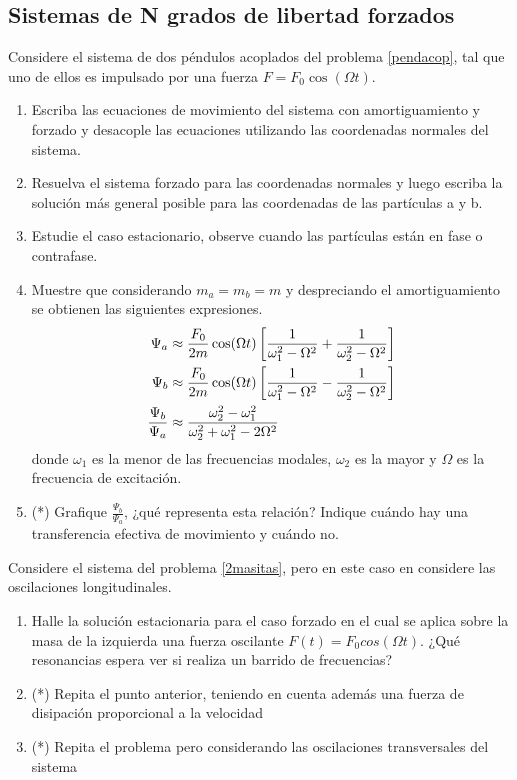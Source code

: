 \subsection*{Sistemas de N grados de libertad forzados}


\item Considere el sistema de dos péndulos acoplados del problema \ref{pendacop}, tal que uno de ellos es impulsado por una fuerza $F= F_0 \cos(\Omega t)$.  
\begin{enumerate}
	\item Escriba las ecuaciones de movimiento del sistema con amortiguamiento y forzado y desacople las ecuaciones utilizando las coordenadas normales del sistema.
	\item Resuelva el sistema forzado para las coordenadas normales y luego escriba la solución más general posible para las coordenadas de las partículas a y b.
	\item Estudie el caso estacionario, observe cuando las partículas están en fase o contrafase.
	\item Muestre que considerando $m_a= m_b= m$ y despreciando el amortiguamiento se obtienen las siguientes expresiones.
		\begin{align}
			\Psi_a &\approx \frac{F_0}{2m} \cos(\Omega t) \left[ \frac{1}{\omega_1^2 - \Omega^2 } + \frac{1}{\omega_2^2 -\Omega^2} \right] \notag \\
			\Psi_b &\approx \frac{F_0}{2m} \cos(\Omega t) \left[ \frac{1}{\omega_1^2 - \Omega^2 } - \frac{1}{\omega_2^2 -\Omega^2} \right] \notag \\
			\frac{\Psi_b}{\Psi_a} &\approx \frac{\omega_2^2 - \omega_1^2}{\omega_2^2 + \omega_1^2 - 2 \Omega^2} \notag
		\end{align}
	donde $\omega_{1}$ es la menor de las frecuencias modales, $\omega_{2}$ es la mayor y $\Omega$ es la frecuencia de excitación.
	\item (*) Grafique $\frac{\Psi_b}{\Psi_a}$, ¿qué representa esta relación?
	Indique cuándo hay una transferencia efectiva de movimiento y cuándo no.
\end{enumerate}


\item Considere el sistema del problema \ref{2masitas}, pero en este caso en considere las oscilaciones longitudinales.
\begin{enumerate}
    \item Halle la solución estacionaria para el caso forzado en el cual se aplica sobre la masa de la izquierda una fuerza oscilante $F(t)= F_0 cos(\Omega t)$.
		¿Qué resonancias espera ver si realiza un barrido de frecuencias?
		\item (*) Repita el punto anterior, teniendo en cuenta además una fuerza de disipación proporcional a la velocidad
		\item (*) Repita el problema pero considerando las oscilaciones transversales del sistema
\end{enumerate}



